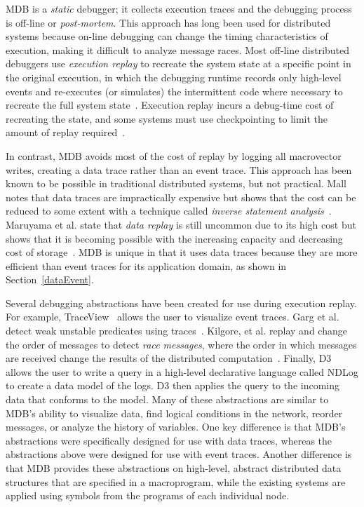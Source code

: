MDB is a \emph{static} debugger; it collects execution traces and the debugging
process is off-line or \emph{post-mortem}.  This approach has long been used for
distributed systems because on-line debugging can change the timing
characteristics of execution, making it difficult to analyze message races.
Most off-line distributed debuggers use \emph{execution replay} to recreate the
system state at a specific point in the original execution, in which the
debugging runtime records only high-level events and re-executes (or simulates)
the intermittent code where necessary to recreate the full system
state~\cite{Wittie1986,LeBlanc1987}. Execution replay incurs a debug-time cost
of recreating the state, and some systems must use checkpointing to limit the
amount of replay required~\cite{Wittie1986}.

In contrast, MDB avoids most of the cost of replay by logging all macrovector
writes, creating a data trace rather than an event trace.  This approach has
been known to be possible in traditional distributed systems, but not practical.
Mall notes that data traces are impractically expensive but shows that the cost
can be reduced to some extent with a technique called \emph{inverse statement
analysis}~\cite{Mall1999}. Maruyama et al. state that \emph{data replay} is
still uncommon due to its high cost but shows that it is becoming possible with
the increasing capacity and decreasing cost of storage~\cite{Maruyama2005}. MDB
is unique in that it uses data traces because they are more efficient than event
traces for its application domain, as shown in Section~\ref{dataEvent}.

Several debugging abstractions have been created for use during execution
replay. For example, TraceView~\cite{Malony1991} allows the user to visualize
event traces. Garg et al. detect weak unstable predicates using
traces~\cite{Garg1994}.  Kilgore, et al. replay and change the order of messages
to detect \emph{race messages}, where the order in which messages are received
change the results of the distributed computation~\cite{Kilgore1997}.
Finally, D3~\cite{Chun2008} allows the user to write a query in a high-level
declarative language called NDLog to create a data model of the logs. D3 then
applies the query to the incoming data that conforms to the model.  Many of
these abstractions are similar to MDB's ability to visualize data, find logical
conditions in the network, reorder messages, or analyze the history of
variables.  One key difference is that MDB's abstractions were specifically
designed for use with data traces, whereas the abstractions above were designed
for use with event traces.  Another difference is that MDB provides these
abstractions on high-level, abstract distributed data structures that are
specified in a macroprogram, while the existing systems are applied using
symbols from the programs of each individual node.

